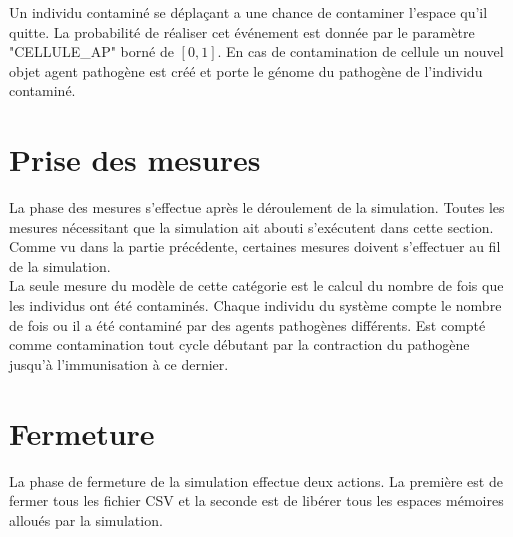 Un individu contaminé se déplaçant a une chance de contaminer l'espace qu'il quitte. La probabilité de réaliser cet événement est donnée par le paramètre "CELLULE\_AP" borné de $[0,1]$. En cas de contamination de cellule un nouvel objet agent pathogène est créé et porte le génome du pathogène de l'individu contaminé. 

\section{Prise des mesures}

La phase des mesures s'effectue après le déroulement de la simulation. Toutes les mesures nécessitant que la simulation ait abouti s'exécutent dans cette section. Comme vu dans la partie précédente, certaines mesures doivent s'effectuer au fil de la simulation.\\ 

La seule mesure du modèle de cette catégorie est le calcul du nombre de fois que les individus ont été contaminés. Chaque individu du système compte le nombre de fois ou il a été contaminé par des agents pathogènes différents. Est compté comme contamination tout cycle débutant par la contraction du pathogène jusqu'à l'immunisation à ce dernier. 

\section{Fermeture}

La phase de fermeture de la simulation effectue deux actions. La première est de fermer tous les fichier CSV et la seconde est de libérer tous les espaces mémoires alloués par la simulation.